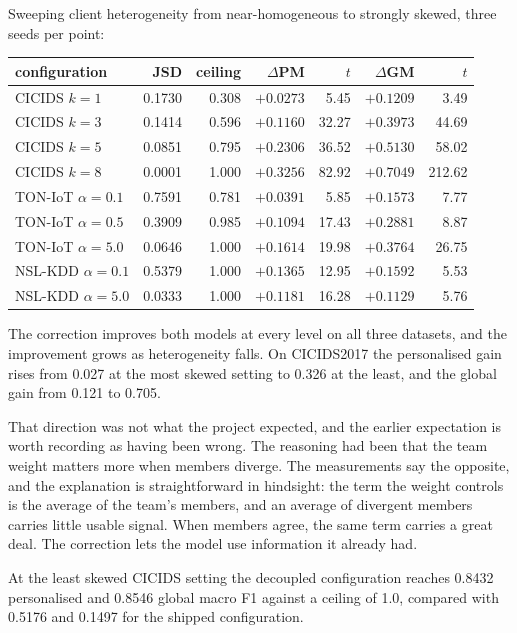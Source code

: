Sweeping client heterogeneity from near-homogeneous to strongly skewed, three
seeds per point:

\begin{center}
\begin{tabular}{lrrrrrr}
\toprule
configuration & JSD & ceiling & $\Delta$PM & $t$ & $\Delta$GM & $t$ \\
\midrule
CICIDS $k{=}1$ & 0.1730 & 0.308 & $+0.0273$ & 5.45 & $+0.1209$ & 3.49 \\
CICIDS $k{=}3$ & 0.1414 & 0.596 & $+0.1160$ & 32.27 & $+0.3973$ & 44.69 \\
CICIDS $k{=}5$ & 0.0851 & 0.795 & $+0.2306$ & 36.52 & $+0.5130$ & 58.02 \\
CICIDS $k{=}8$ & 0.0001 & 1.000 & $+0.3256$ & 82.92 & $+0.7049$ & 212.62 \\
TON-IoT $\alpha{=}0.1$ & 0.7591 & 0.781 & $+0.0391$ & 5.85 & $+0.1573$ & 7.77 \\
TON-IoT $\alpha{=}0.5$ & 0.3909 & 0.985 & $+0.1094$ & 17.43 & $+0.2881$ & 8.87 \\
TON-IoT $\alpha{=}5.0$ & 0.0646 & 1.000 & $+0.1614$ & 19.98 & $+0.3764$ & 26.75 \\
NSL-KDD $\alpha{=}0.1$ & 0.5379 & 1.000 & $+0.1365$ & 12.95 & $+0.1592$ & 5.53 \\
NSL-KDD $\alpha{=}5.0$ & 0.0333 & 1.000 & $+0.1181$ & 16.28 & $+0.1129$ & 5.76 \\
\bottomrule
\end{tabular}
\end{center}

The correction improves both models at every level on all three datasets, and
the improvement grows as heterogeneity falls. On CICIDS2017 the personalised
gain rises from 0.027 at the most skewed setting to 0.326 at the least, and the
global gain from 0.121 to 0.705.

That direction was not what the project expected, and the earlier expectation is
worth recording as having been wrong. The reasoning had been that the team
weight matters more when members diverge. The measurements say the opposite, and
the explanation is straightforward in hindsight: the term the weight controls is
the average of the team's members, and an average of divergent members carries
little usable signal. When members agree, the same term carries a great deal.
The correction lets the model use information it already had.

At the least skewed CICIDS setting the decoupled configuration reaches 0.8432
personalised and 0.8546 global macro F1 against a ceiling of 1.0, compared with
0.5176 and 0.1497 for the shipped configuration.

